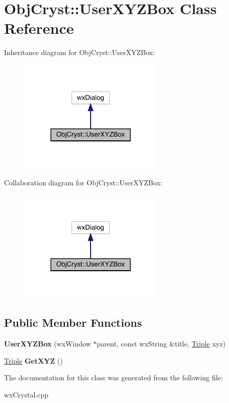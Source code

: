 \hypertarget{class_obj_cryst_1_1_user_x_y_z_box}{}\section{Obj\+Cryst\+::User\+X\+Y\+Z\+Box Class Reference}
\label{class_obj_cryst_1_1_user_x_y_z_box}


Inheritance diagram for Obj\+Cryst\+::User\+X\+Y\+Z\+Box\+:
\nopagebreak
\begin{figure}[H]
\begin{center}
\leavevmode
\includegraphics[width=198pt]{class_obj_cryst_1_1_user_x_y_z_box__inherit__graph}
\end{center}
\end{figure}


Collaboration diagram for Obj\+Cryst\+::User\+X\+Y\+Z\+Box\+:
\nopagebreak
\begin{figure}[H]
\begin{center}
\leavevmode
\includegraphics[width=198pt]{class_obj_cryst_1_1_user_x_y_z_box__coll__graph}
\end{center}
\end{figure}
\subsection*{Public Member Functions}
\begin{DoxyCompactItemize}
\item 
\mbox{\label{class_obj_cryst_1_1_user_x_y_z_box_a9acc968d066d07643ab53c173338937c}} 
{\bfseries User\+X\+Y\+Z\+Box} (wx\+Window $\ast$parent, const wx\+String \&title, \mbox{\hyperlink{struct_obj_cryst_1_1_triple}{Triple}} xyz)
\item 
\mbox{\label{class_obj_cryst_1_1_user_x_y_z_box_ad69d48689b03a9da94a3dca79fa54293}} 
\mbox{\hyperlink{struct_obj_cryst_1_1_triple}{Triple}} {\bfseries Get\+X\+YZ} ()
\end{DoxyCompactItemize}


The documentation for this class was generated from the following file\+:\begin{DoxyCompactItemize}
\item 
wx\+Crystal.\+cpp\end{DoxyCompactItemize}
